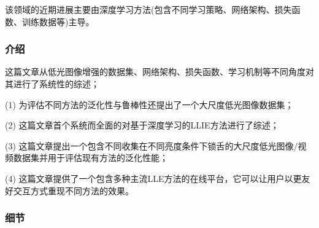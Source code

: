 \documentclass[letterpaper,12pt]{article}
\begin{document}
	该领域的近期进展主要由深度学习方法(包含不同学习策略、网络架构、损失函数、训练数据等)主导。
	
	\subsubsection{介绍}
	
	这篇文章从低光图像增强的数据集、网络架构、损失函数、学习机制等不同角度对其进行了系统性的综述；
	
	(1) 为评估不同方法的泛化性与鲁棒性还提出了一个大尺度低光图像数据集；
	
	(2) 这篇文章首个系统而全面的对基于深度学习的LLIE方法进行了综述；
	
	(3) 这篇文章提出一个包含不同收集在不同亮度条件下锁舌的大尺度低光图像/视频数据集并用于评估现有方法的泛化性能；
	
	(4) 这篇文章提供了一个包含多种主流LLE方法的在线平台，它可以让用户以更友好交互方式重现不同方法的效果。
	
	
	\subsubsection{细节}
	
	\renewcommand{\tablename}{Table}
	
\end{document}
